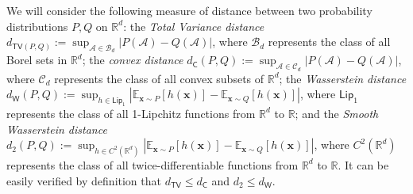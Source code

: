 We will consider the following measure of distance between two probability distributions $P,Q$ on $\mathbb{R}^d$: the \emph{Total Variance distance} $d_{\mathsf{TV}(P,Q)}:= \sup_{\mathcal{A} \in \mathscr{B}_d} |P(\mathcal{A}) - Q(\mathcal{A})|$, where $\mathscr{B}_d$ represents the class of all Borel sets in $\mathbb{R}^d$; the \emph{convex distance} $d_{\mathsf{C}}(P,Q) := \sup_{\mathcal{A} \in \mathscr{C}_d} |P(\mathcal{A}) - Q(\mathcal{A})|$, where  $\mathscr{C}_d$ represents the class of all convex subsets of $\mathbb{R}^d$; the \emph{Wasserstein distance} $d_{\mathsf{W}}(P,Q) := \sup_{h \in \mathsf{Lip}_1}|\mathbb{E}_{\bm{x} \sim P}[h(\bm{x})] - \mathbb{E}_{\bm{x} \sim Q}[h(\bm{x})]|$, where $\mathsf{Lip}_1$ represents the class of all 1-Lipchitz functions from $\mathbb{R}^d$ to $\mathbb{R}$; and  the \emph{Smooth Wasserstein distance} $d_{2}(P,Q) := \sup_{h \in C^2(\mathbb{R}^d)}|\mathbb{E}_{\bm{x} \sim P}[h(\bm{x})] - \mathbb{E}_{\bm{x} \sim Q}[h(\bm{x})]|$, where $C^2(\mathbb{R}^d)$ represents the class of all twice-differentiable functions from $\mathbb{R}^d$ to $\mathbb{R}$.  It can be easily verified by definition that $d_{\mathsf{TV}} \leq d_{\mathsf{C}}$ and $d_2 \leq d_{\mathsf{W}}$.




